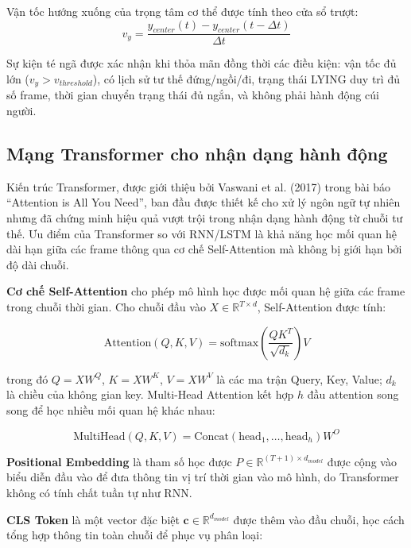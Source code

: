 Vận tốc hướng xuống của trọng tâm cơ thể được tính theo cửa sổ trượt:
\begin{equation}
    v_y = \frac{y_{center}(t) - y_{center}(t - \Delta t)}{\Delta t}
\end{equation}

Sự kiện té ngã được xác nhận khi thỏa mãn đồng thời các điều kiện: vận tốc đủ lớn ($v_y > v_{threshold}$), có lịch sử tư thế đứng/ngồi/đi, trạng thái LYING duy trì đủ số frame, thời gian chuyển trạng thái đủ ngắn, và không phải hành động cúi người.

\subsection{Mạng Transformer cho nhận dạng hành động}

Kiến trúc Transformer, được giới thiệu bởi Vaswani et al. (2017) trong bài báo ``Attention is All You Need'', ban đầu được thiết kế cho xử lý ngôn ngữ tự nhiên nhưng đã chứng minh hiệu quả vượt trội trong nhận dạng hành động từ chuỗi tư thế. Ưu điểm của Transformer so với RNN/LSTM là khả năng học mối quan hệ dài hạn giữa các frame thông qua cơ chế Self-Attention mà không bị giới hạn bởi độ dài chuỗi.

\textbf{Cơ chế Self-Attention} cho phép mô hình học được mối quan hệ giữa các frame trong chuỗi thời gian. Cho chuỗi đầu vào $X \in \mathbb{R}^{T \times d}$, Self-Attention được tính:

\begin{equation}
    \text{Attention}(Q, K, V) = \text{softmax}\left(\frac{QK^T}{\sqrt{d_k}}\right)V
\end{equation}

trong đó $Q = XW^Q$, $K = XW^K$, $V = XW^V$ là các ma trận Query, Key, Value; $d_k$ là chiều của không gian key. Multi-Head Attention kết hợp $h$ đầu attention song song để học nhiều mối quan hệ khác nhau:

\begin{equation}
    \text{MultiHead}(Q,K,V) = \text{Concat}(\text{head}_1, \ldots, \text{head}_h)W^O
\end{equation}

\textbf{Positional Embedding} là tham số học được $P \in \mathbb{R}^{(T+1) \times d_{model}}$ được cộng vào biểu diễn đầu vào để đưa thông tin vị trí thời gian vào mô hình, do Transformer không có tính chất tuần tự như RNN.

\textbf{CLS Token} là một vector đặc biệt $\mathbf{c} \in \mathbb{R}^{d_{model}}$ được thêm vào đầu chuỗi, học cách tổng hợp thông tin toàn chuỗi để phục vụ phân loại:

